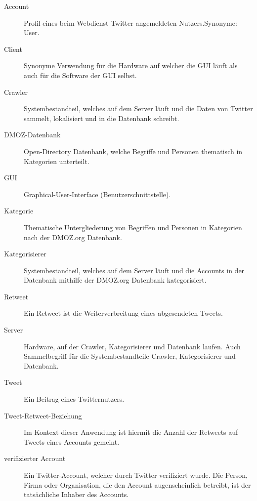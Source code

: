 
\begin{description}
	\item[Account] Profil eines beim Webdienst Twitter angemeldeten Nutzers.Synonyme: User.
	\item[Client] Synonyme Verwendung für die Hardware auf welcher die GUI läuft als auch für die Software der GUI selbst.
	\item[Crawler] Systembestandteil, welches auf dem Server läuft und die Daten von Twitter sammelt, lokalisiert und in die Datenbank schreibt.
	\item [DMOZ-Datenbank] Open-Directory Datenbank, welche Begriffe und Personen thematisch in Kategorien unterteilt.
	\item[GUI] Graphical-User-Interface (Benutzerschnittstelle).
	\item[Kategorie] Thematische Untergliederung von Begriffen und Personen in Kategorien nach der DMOZ.org Datenbank.
	\item[Kategorisierer] Systembestandteil, welches auf dem Server läuft und die Accounts in der Datenbank mithilfe der DMOZ.org Datenbank kategorisiert.
	\item[Retweet] Ein Retweet ist die Weiterverbreitung eines abgesendeten Tweets.
	\item[Server] Hardware, auf der Crawler, Kategorisierer und  Datenbank laufen. Auch Sammelbegriff für die Systembestandteile Crawler, Kategorisierer und Datenbank.
	\item[Tweet] Ein Beitrag eines Twitternutzers.
	\item[Tweet-Retweet-Beziehung] Im Kontext dieser Anwendung ist hiermit die Anzahl der Retweets auf Tweets eines Accounts gemeint. 
	\item[verifizierter Account] Ein Twitter-Account, welcher durch Twitter verifiziert wurde. Die Person, Firma oder Organisation, die den Account augenscheinlich betreibt, ist der tatsächliche Inhaber des Accounts.
\end{description}
